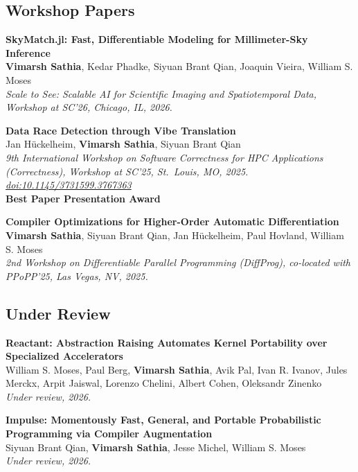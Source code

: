 \documentclass[11pt,letterpaper]{article}
\newcommand{\me}{\textbf{Vimarsh Sathia}}
\newenvironment{tagged}[1]{%
  \begin{description}[leftmargin=#1, labelwidth=\dimexpr#1-0.8em\relax,
    labelsep=0.8em, align=right, font=\normalfont, itemsep=1pt, topsep=1pt]}
  {\end{description}}
\newcommand{\pub}[4]{\begin{minipage}[t]{\linewidth}\raggedright\textbf{#1}\\ #2\\ \textit{#3}#4\end{minipage}}
\newcommand{\award}[1]{\\ \textcolor{red!60!black}{\textbf{#1}}}
\begin{document}
\subsection*{Workshop Papers}
\begin{tagged}{7.6em}
  \item[{[SC-W'26]}] \pub{SkyMatch.jl: Fast, Differentiable Modeling for Millimeter-Sky Inference}
    {\me, Kedar Phadke, Siyuan Brant Qian, Joaquin Vieira, William S. Moses}
    {Scale to See: Scalable AI for Scientific Imaging and Spatiotemporal Data, Workshop at SC'26, Chicago, IL, 2026.}{}

  \item[{[SC-W'25]}] \pub{Data Race Detection through Vibe Translation}
    {Jan H\"uckelheim, \me, Siyuan Brant Qian}
    {9th International Workshop on Software Correctness for HPC Applications (Correctness), Workshop at SC'25, St.~Louis, MO, 2025.
     \href{https://doi.org/10.1145/3731599.3767363}{doi:10.1145/3731599.3767363}}
    {\award{Best Paper Presentation Award}}

  \item[{[DiffProg'25]}] \pub{Compiler Optimizations for Higher-Order Automatic Differentiation}
    {\me, Siyuan Brant Qian, Jan H\"uckelheim, Paul Hovland, William S. Moses}
    {2nd Workshop on Differentiable Parallel Programming (DiffProg), co-located with PPoPP'25, Las Vegas, NV, 2025.}{}
\end{tagged}


\subsection*{Under Review}
\begin{tagged}{7.6em}
  \item[{[Submitted]}] \pub{Reactant: Abstraction Raising Automates Kernel Portability over Specialized Accelerators}
    {William S. Moses, Paul Berg, \me, Avik Pal, Ivan R. Ivanov, Jules Merckx, Arpit Jaiswal, Lorenzo Chelini, Albert Cohen, Oleksandr Zinenko}
    {Under review, 2026.}{}

  \item[{[Submitted]}] \pub{Impulse: Momentously Fast, General, and Portable Probabilistic Programming via Compiler Augmentation}
    {Siyuan Brant Qian, \me, Jesse Michel, William S. Moses}
    {Under review, 2026.}{}
\end{tagged}
\end{document}
